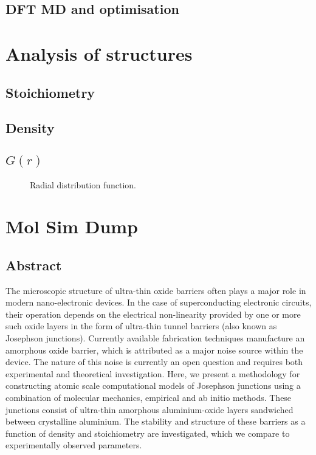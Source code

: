 \subsection{DFT MD and optimisation}
\section{Analysis of structures}
\subsection{Stoichiometry}
\subsection{Density}
\subsection{\texorpdfstring{$G(r)$}{G(r)}}
\begin{figure}[htp]
\centering
\resizebox{\textwidth}{!}{}
\caption[Radial Distribution Function]{\label{fig:gofr}Radial distribution function.}
\end{figure} 

\section{Mol Sim Dump}
\subsection{Abstract}
The microscopic structure of ultra-thin oxide barriers often plays a major role in modern nano-electronic devices.
In the case of superconducting electronic circuits, their operation depends on the electrical non-linearity provided by one or more such oxide layers in the form of ultra-thin tunnel barriers (also known as Josephson junctions).
Currently available fabrication techniques manufacture an amorphous oxide barrier, which is attributed as a major noise source within the device.
The nature of this noise is currently an open question and requires both experimental and theoretical investigation.
Here, we present a methodology for constructing atomic scale computational models of Josephson junctions using a combination of molecular mechanics, empirical and ab initio methods.
These junctions consist of ultra-thin amorphous aluminium-oxide layers sandwiched between crystalline aluminium. The stability and structure of these barriers as a function of density and stoichiometry are investigated, which we compare to experimentally observed parameters.


